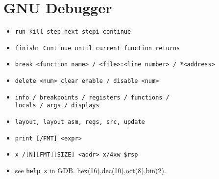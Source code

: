 \section{GNU Debugger}
\begin{itemize}[nosep]
    \item \tt{run} \tt{kill} \tt{step} \tt{next} \tt{stepi} \tt{continue}
    \item \tt{finish}: Continue until current function returns
    \item \tt{break <function name> / <file>:<line number> / *<address>}
    \item \tt{delete <num>} \tt{clear} \tt{enable / disable <num>}
    \item \tt{info /  breakpoints / registers / functions /\\locals / args / displays}
    \item \tt{layout}, \tt{layout asm, regs, src}, \tt{update}
\item \tt{print [/FMT] <expr>}
\item \tt{x /[N][FMT][SIZE] <addr>} \tt{x/4xw \$rsp}
\item \quad see \texttt{help x} in GDB. hex(16),dec(10),oct(8),bin(2).
\end{itemize}